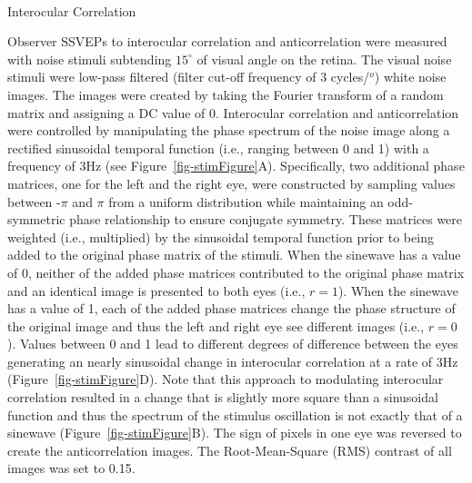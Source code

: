 \documentclass[
  12pt,
]{article}
\makeatletter
\let\oldparagraph\paragraph
\renewcommand{\paragraph}{
    \@ifstar
      \xxxParagraphStar
      \xxxParagraphNoStar
  }
\newcommand{\xxxParagraphStar}[1]{\oldparagraph*{#1}\mbox{}}
\newcommand{\xxxParagraphNoStar}[1]{\oldparagraph{#1}\mbox{}}
\makeatother
\begin{document}
\paragraph{Interocular Correlation}\label{interocular-correlation}

Observer SSVEPs to interocular correlation and anticorrelation were
measured with noise stimuli subtending \(15^\circ\) of visual angle on
the retina. The visual noise stimuli were low-pass filtered (filter
cut-off frequency of 3 cycles/\(^o\)) white noise images. The images
were created by taking the Fourier transform of a random matrix and
assigning a DC value of 0. Interocular correlation and anticorrelation
were controlled by manipulating the phase spectrum of the noise image
along a rectified sinusoidal temporal function (i.e., ranging between 0
and 1) with a frequency of 3Hz (see Figure~\ref{fig-stimFigure}A).
Specifically, two additional phase matrices, one for the left and the
right eye, were constructed by sampling values between -\(\pi\) and
\(\pi\) from a uniform distribution while maintaining an odd-symmetric
phase relationship to ensure conjugate symmetry. These matrices were
weighted (i.e., multiplied) by the sinusoidal temporal function prior to
being added to the original phase matrix of the stimuli. When the
sinewave has a value of 0, neither of the added phase matrices
contributed to the original phase matrix and an identical image is
presented to both eyes (i.e., \(r = 1\)). When the sinewave has a value
of 1, each of the added phase matrices change the phase structure of the
original image and thus the left and right eye see different images
(i.e., \(r = 0\)). Values between 0 and 1 lead to different degrees of
difference between the eyes generating an nearly sinusoidal change in
interocular correlation at a rate of 3Hz (Figure~\ref{fig-stimFigure}D).
Note that this approach to modulating interocular correlation resulted
in a change that is slightly more square than a sinusoidal function and
thus the spectrum of the stimulus oscillation is not exactly that of a
sinewave (Figure~\ref{fig-stimFigure}B). The sign of pixels in one eye
was reversed to create the anticorrelation images. The Root-Mean-Square
(RMS) contrast of all images was set to 0.15.
\end{document}
